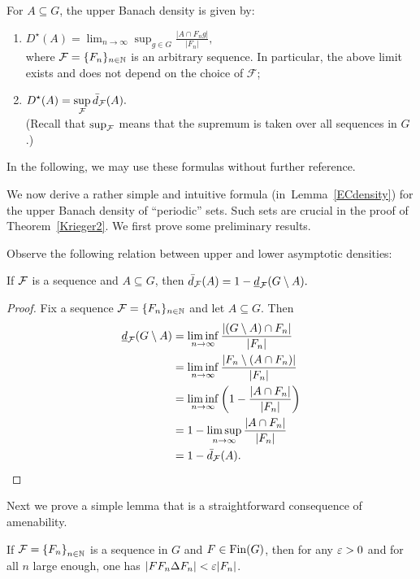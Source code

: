 \begin{lem}
For $A\subseteq G$, the upper Banach density is given by:
\begin{enumerate}
\item \cite[Lemma 2.9]{DHZ16}\hspace{5mm} $\displaystyle D^\star(A)=\lim_{n\to\infty}\sup_{g\in G}\frac{|A\cap F_ng|}{|F_n|},$ \\ where $\operatorname{\mathcal{F}}=\{F_n\}_{n\in\mathbb{N}}$ is an arbitrary \Folner sequence. In particular, the above limit exists and does not depend on the choice of $\mathcal F$;
\item \cite[Lemma 3.3]{BBF10} \hspace{5mm}  $\displaystyle D^\star(A) =  \sup_{\operatorname{\mathcal{F}}} \bar{d}_{\operatorname{\mathcal{F}}}(A).$ \\
(Recall that $\sup_{\operatorname{\mathcal{F}}}$ means that the supremum is taken over all \Folner sequences in $G$.)
\end{enumerate}
\end{lem}
\noindent
In the following, we may use these formulas without further reference.


We now derive a rather simple and intuitive formula (in~Lemma~\ref{ECdensity}) for the upper Banach density of ``periodic'' sets.
%
Such sets are crucial in the proof of Theorem~\ref{Krieger2}.
%
We first prove some preliminary results.

Observe the following relation between upper and lower asymptotic densities:

\begin{lem}\label{lem:upper-lower}
If $\operatorname{\mathcal{F}}$ is a \Folner sequence and $A\subseteq G$, then 
$
\bar{d}_{\operatorname{\mathcal{F}}}(A)=1-\underline{d}_{\operatorname{\mathcal{F}}}(G\setminus A).
$
\end{lem}

\begin{proof}
Fix a \Folner sequence $\operatorname{\mathcal{F}}=\{F_n\}_{n\in\mathbb{N}}$ and let $A\subseteq G$. Then
\begin{align*}
\underline{d}_{\operatorname{\mathcal{F}}}(G\setminus A)&=\liminf_{n\to\infty}\frac{|(G\setminus A)\cap F_n|}{|F_n|} \\
&=\liminf_{n\to\infty}\frac{|F_n\setminus (A\cap F_n)|}{|F_n|} \\
&= \liminf_{n\to\infty}\left(1- \frac{|A\cap F_n|}{|F_n|} \right) \\
& = 1- \limsup_{n\to\infty} \frac{|A\cap F_n|}{|F_n|} \\
&=1-\bar{d}_{\operatorname{\mathcal{F}}}(A). \qedhere
\end{align*}
\end{proof}

\noindent
Next we prove a simple lemma that is a straightforward consequence of amenability.
\begin{lem}\label{lem:Folner_inv}
If $\operatorname{\mathcal{F}}=\left\{F_n\right\}_{n\in\mathbb{N}}$ is a \Folner sequence in $G$ and $F\in\operatorname{Fin}(G)$, then for any $\varepsilon>0$ and for all $n$ large enough, one has $|FF_n\Delta F_n|<\varepsilon|F_n|$.
\end{lem}

